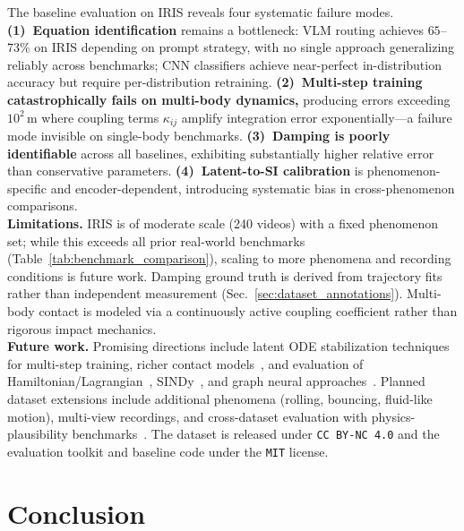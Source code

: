 \documentclass[runningheads]{llncs}
\begin{document}
The baseline evaluation on IRIS reveals four systematic failure modes.
\textbf{(1)~Equation identification} remains a bottleneck: VLM routing achieves $65$--$73\%$ on IRIS depending on prompt strategy, with no single approach generalizing reliably across benchmarks; CNN classifiers achieve near-perfect in-distribution accuracy but require per-distribution retraining.
\textbf{(2)~Multi-step training catastrophically fails on multi-body dynamics,} producing errors exceeding $10^2$\,m where coupling terms $\kappa_{ij}$ amplify integration error exponentially---a failure mode invisible on single-body benchmarks.
\textbf{(3)~Damping is poorly identifiable} across all baselines, exhibiting substantially higher relative error than conservative parameters.
\textbf{(4)~Latent-to-SI calibration} is phenomenon-specific and encoder-dependent, introducing systematic bias in cross-phenomenon comparisons.
\\
\noindent
\textbf{Limitations.} IRIS is of moderate scale (240 videos) with a fixed phenomenon set; while this exceeds all prior real-world benchmarks (Table~\ref{tab:benchmark_comparison}), scaling to more phenomena and recording conditions is future work. Damping ground truth is derived from trajectory fits rather than independent measurement (Sec.~\ref{sec:dataset_annotations}). Multi-body contact is modeled via a continuously active coupling coefficient rather than rigorous impact mechanics.
\\
\noindent
\textbf{Future work.} Promising directions include latent ODE stabilization techniques~\cite{finlay2020trainneuralodeworld, wang2021learningsolutionoperatorparametric} for multi-step training, richer contact models~\cite{wang2026contact, song2024diffsim}, and evaluation of Hamiltonian/Lagrangian~\cite{greydanus2019hamiltonian, cranmer2020lagrangian}, SINDy~\cite{brunton2016discovering}, and graph neural approaches~\cite{sanchez2020learning}. Planned dataset extensions include additional phenomena (rolling, bouncing, fluid-like motion), multi-view recordings, and cross-dataset evaluation with physics-plausibility benchmarks~\cite{zhang2025morpheus, guo2025rbench, liang2025worldlens}. The dataset is released under \texttt{CC BY-NC 4.0} and the evaluation toolkit and baseline code under the \texttt{MIT} license.


\section{Conclusion}
\label{sec:conclusion}
\end{document}
